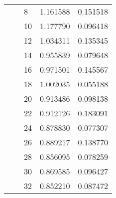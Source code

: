 \begin{tabular}{lllrr}
                      &            & 8  &  1.161588 &  0.151518 \\
                      &            & 10 &  1.177790 &  0.096418 \\
                      &            & 12 &  1.034311 &  0.135345 \\
                      &            & 14 &  0.955839 &  0.079648 \\
                      &            & 16 &  0.971501 &  0.145567 \\
                      &            & 18 &  1.002035 &  0.055188 \\
                      &            & 20 &  0.913486 &  0.098138 \\
                      &            & 22 &  0.912126 &  0.183091 \\
                      &            & 24 &  0.878830 &  0.077307 \\
                      &            & 26 &  0.889217 &  0.138770 \\
                      &            & 28 &  0.856095 &  0.078259 \\
                      &            & 30 &  0.869585 &  0.096427 \\
                      &            & 32 &  0.852210 &  0.087472 \\
\bottomrule
\end{tabular}
